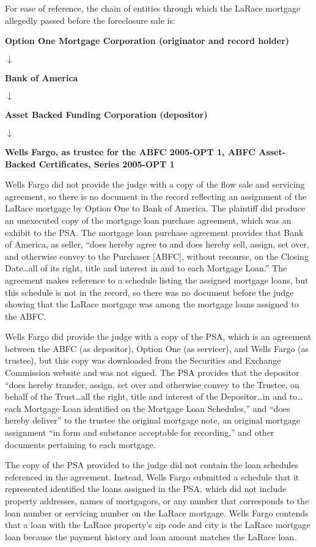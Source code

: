 For ease of reference, the chain of entities through which the LaRace mortgage
allegedly passed before the foreclosure sale is:
\begin{center}
\textbf{Option One Mortgage Corporation (originator and record holder)}

$\downarrow$

\textbf{Bank of America}

$\downarrow$

\textbf{Asset Backed Funding Corporation (depositor)}

$\downarrow$

\textbf{Wells Fargo, as trustee for the ABFC 2005-OPT 1, ABFC Asset-Backed
Certificates, Series 2005-OPT 1}
\end{center}
Wells Fargo did not provide the judge with a copy of the flow sale and servicing
agreement, so there is no document in the record reflecting an assignment of
the LaRace mortgage by Option One to Bank of America. The plaintiff did produce
an unexecuted copy of the mortgage loan purchase agreement, which was an
exhibit to the PSA. The mortgage loan purchase agreement provides that Bank of
America, as seller, ``does hereby agree to and does hereby sell, assign, set
over, and otherwise convey to the Purchaser [ABFC], without recourse, on the
Closing Date\dots all of its right, title and interest in and to each
Mortgage Loan.'' The agreement makes reference to a schedule listing the
assigned mortgage loans, but this schedule is not in the record, so there was
no document before the judge showing that the LaRace mortgage was among the
mortgage loans assigned to the ABFC.

Wells Fargo did provide the judge with a copy of the PSA, which is an agreement
between the ABFC (as depositor), Option One (as servicer), and Wells Fargo (as
trustee), but this copy was downloaded from the Securities and Exchange
Commission website and was not signed. The PSA provides that the depositor
``does hereby transfer, assign, set over and otherwise convey to the Trustee,
on behalf of the Trust\dots all the right, title and interest of the
Depositor\dots in and to\dots each Mortgage Loan identified on the
Mortgage Loan Schedules,'' and ``does hereby deliver'' to the trustee the
original mortgage note, an original mortgage assignment ``in form and substance
acceptable for recording,'' and other documents pertaining to each mortgage.

The copy of the PSA provided to the judge did not contain the loan schedules
referenced in the agreement. Instead, Wells Fargo submitted a schedule that it
represented identified the loans assigned in the PSA, which did not include
property addresses, names of mortgagors, or any number that corresponds to the
loan number or servicing number on the LaRace mortgage. Wells Fargo contends
that a loan with the LaRace property's zip code and city is the LaRace mortgage
loan because the payment history and loan amount matches the LaRace loan.

